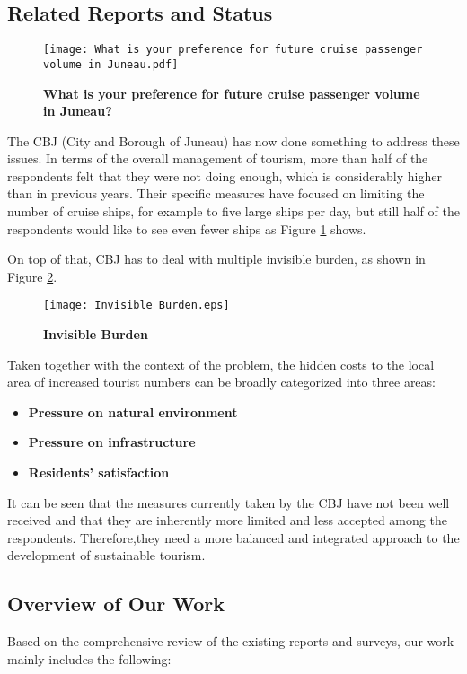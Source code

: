 \documentclass{mcmthesis}
\begin{document}
\subsection{Related Reports and Status}
\begin{figure}[H]
  \small
  \centering
  \texttt{[image: What is your preference for future cruise passenger volume in Juneau.pdf]}
  \caption{\textbf{What is your preference for future cruise passenger volume in Juneau?}} \label{fig:Figure3}
\end{figure}
{The CBJ (City and Borough of Juneau) has now done something to address these issues. In terms of the overall management of tourism, more than half of the respondents felt that they were not doing enough, which is considerably higher than in previous years. Their specific measures have focused on limiting the number of cruise ships, for example to five large ships per day, but still half of the respondents would like to see even fewer ships as Figure \ref{fig:Figure3} shows.}


{On top of that, CBJ has to deal with multiple invisible burden, as shown in Figure \ref{fig:Figure4}.\cite{4}}

\begin{figure}[h]
  \small
  \centering
  \texttt{[image: Invisible Burden.eps]}
  \caption{\textbf{Invisible Burden}} \label{fig:Figure4}
\end{figure}

{Taken together with the context of the problem, the hidden costs to the local area of increased tourist numbers can be broadly categorized into three areas:}
\begin{itemize}
  \item \textbf{Pressure on natural environment} 
  \item \textbf{Pressure on infrastructure} 
  \item \textbf{Residents' satisfaction} 
\end{itemize}


{It can be seen that the measures currently taken by the CBJ have not been well received and that they are inherently more limited and less accepted among the respondents. Therefore,they need a more balanced and integrated approach to the development of sustainable tourism.}

\subsection{Overview of Our Work}
{Based on the comprehensive review of the existing reports and surveys, our work mainly includes the following:}
\end{document}
